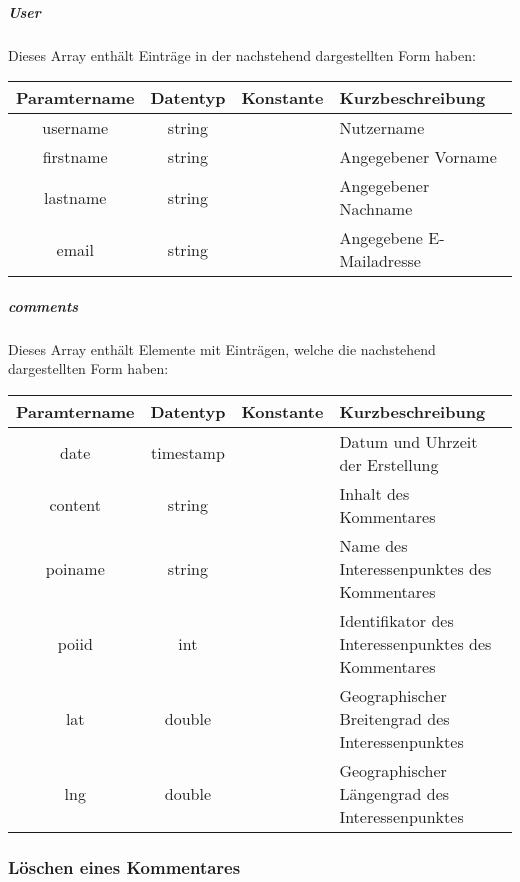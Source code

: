 \subparagraph{User}Dieses Array enthält Einträge in der nachstehend dargestellten Form haben:
\begin{table}[H]
	\begin{tabular}{|c|c|c|p{6.5cm}|}
		\hline
		\textbf{Paramtername} & \textbf{Datentyp} & \textbf{Konstante} & \textbf{Kurzbeschreibung}    \\ \hline
		username           & string            &                 & Nutzername \\ \hline
		firstname          & string            &                 & Angegebener Vorname \\ \hline
		lastname           & string            &                 & Angegebener Nachname \\ \hline
		email              & string            &                 & Angegebene E-Mailadresse \\ \hline
	\end{tabular}
\end{table}
\subparagraph{comments}Dieses Array enthält Elemente mit Einträgen, welche die nachstehend dargestellten Form haben:
\begin{table}[H]
	\begin{tabular}{|c|c|c|p{6.5cm}|}
		\hline
		\textbf{Paramtername} & \textbf{Datentyp} & \textbf{Konstante} & \textbf{Kurzbeschreibung}                                                                                               \\ \hline
		date               & timestamp         &                 & Datum und Uhrzeit der Erstellung \\ \hline
		content            & string            &                 & Inhalt des Kommentares \\ \hline
		poiname            & string            &                 & Name des Interessenpunktes des Kommentares \\ \hline
		poiid              & int               &                 & Identifikator des Interessenpunktes des Kommentares \\ \hline
		lat                & double            &                 & Geographischer Breitengrad des Interessenpunktes \\ \hline
		lng                & double            &                 & Geographischer Längengrad  des Interessenpunktes \\ \hline
	\end{tabular}
\end{table}
\subsubsection{Löschen eines Kommentares}
